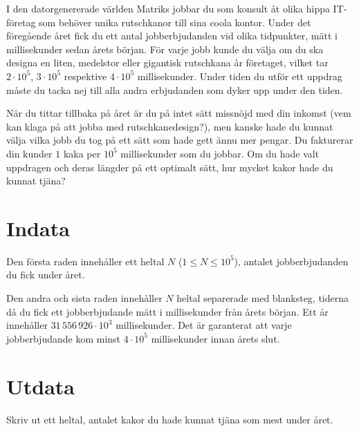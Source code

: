 I den datorgenererade världen Matriks jobbar du som konsult åt olika hippa IT-företag som behöver unika rutschkanor till sina coola kontor.
Under det föregående året fick du ett antal jobberbjudanden vid olika tidpunkter, mätt i millisekunder sedan årets början.
För varje jobb kunde du välja om du ska designa en liten, medelstor eller gigantisk rutschkana år företaget, vilket tar $2 \cdot 10^5$, $3 \cdot 10^5$ respektive $4 \cdot 10^5$ millisekunder.
Under tiden du utför ett uppdrag måste du tacka nej till alla andra erbjudanden som dyker upp under den tiden.

När du tittar tillbaka på året är du på intet sätt missnöjd med din inkomst (vem kan klaga på att jobba med rutschkanedesign?), men kanske hade du kunnat välja vilka jobb du tog på ett sätt som hade gett ännu mer pengar.
Du fakturerar din kunder $1$ kaka per $10^5$ millisekunder som du jobbar.
Om du hade valt uppdragen och deras längder på ett optimalt sätt, hur mycket kakor hade du kunnat tjäna?


\section*{Indata}
Den första raden innehåller ett heltal $N$ ($1 \le N \le 10^5$), antalet jobberbjudanden du fick under året.

Den andra och sista raden innehåller $N$ heltal separerade med blanksteg, tiderna då du fick ett jobberbjudande mätt i millisekunder från årets början.
Ett år innehåller $31\,556\,926 \cdot 10^3$ millisekunder.
Det är garanterat att varje jobberbjudande kom minst $4 \cdot 10^5$ millisekunder innan årets slut.

\section*{Utdata}
Skriv ut ett heltal, antalet kakor du hade kunnat tjäna som mest under året.
